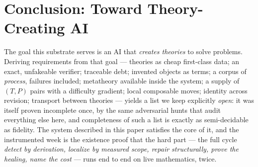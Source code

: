 \documentclass[11pt]{article}
\theoremstyle{remark}\newtheorem{example}{Example}
\begin{document}
\section{Conclusion: Toward Theory-Creating AI}
The goal this substrate serves is an AI that \emph{creates theories} to solve
problems. Deriving requirements from that goal --- theories as cheap first-class data;
an exact, unfakeable verifier; traceable debt; invented objects as terms; a corpus of
\emph{process}, failures included; metatheory available inside the system; a supply of
$(T,P)$ pairs with a difficulty gradient; local composable moves; identity across
revision; transport between theories --- yields a list we keep explicitly \emph{open}:
it was itself proven incomplete once, by the same adversarial hunts that audit
everything else here, and completeness of such a list is exactly as semi-decidable as
fidelity. The system described in this paper satisfies the core of it, and the
instrumented week is the existence proof that the hard part --- the full cycle
\emph{detect by derivation, localize by measured scope, repair structurally, prove the
healing, name the cost} --- runs end to end on live mathematics, twice.
\end{document}
